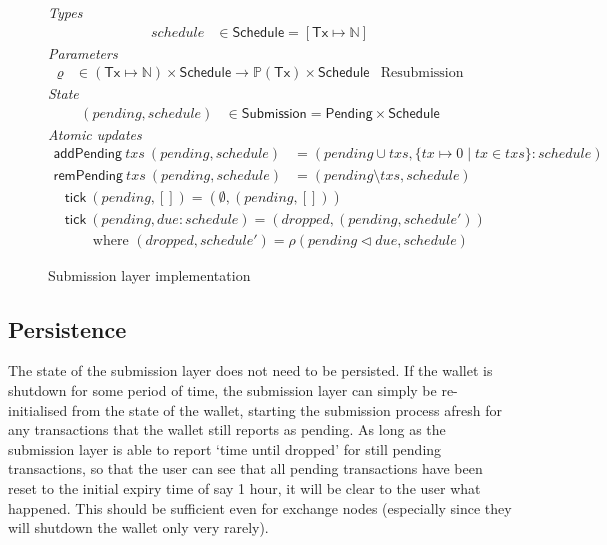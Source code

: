 \documentclass{article}
\newcommand{\restrictdom}{\lhd}
\theoremstyle{definition}{
  \newtheorem{lemma}{Lemma}[section] %
  \newtheorem{definition}[lemma]{Definition}
}
\theoremstyle{theorem}{
  \newtheorem{invariant}[lemma]{Invariant}
  \newtheorem{proofobligation}[lemma]{Proof Obligation}
}
\numberwithin{equation}{lemma}
\begin{document}
\begin{figure}
%
\emph{Types}
%
\begin{align*}
  \mathit{schedule}
& \in \mathsf{Schedule} = [\mathsf{Tx} \mapsto \mathbb{N}]
\end{align*}
%
\emph{Parameters}
%
\begin{align*}
  \varrho
& \in (\mathsf{Tx} \mapsto \mathbb{N}) \times \mathsf{Schedule} \rightarrow \mathbb{P}(\mathsf{Tx}) \times \mathsf{Schedule} & \text{Resubmission}
\end{align*}
%
\emph{State}
%
\begin{align*}
  (\mathit{pending}, \mathit{schedule})
& \in \mathsf{Submission} = \mathsf{Pending} \times \mathsf{Schedule}
\end{align*}
%
\emph{Atomic updates}
%
\begin{align*}
  \mathsf{addPending}
    ~ \mathit{txs}
    ~ (\mathit{pending}, \mathit{schedule})
& = ( \mathit{pending} \cup \mathit{txs}
    , \{ \mathit{tx} \mapsto 0 \mid \mathit{tx} \in \mathit{txs} \} : \mathit{schedule}
    )
\\
  \mathsf{remPending}
    ~ \mathit{txs}
    ~ (\mathit{pending}, \mathit{schedule})
& = ( \mathit{pending} \setminus \mathit{txs}
    , \mathit{schedule}
    )
\end{align*}
\begin{align*}
& \mathsf{tick} ~ (\mathit{pending}, []) = (\emptyset, (\mathit{pending}, [])) \\
& \mathsf{tick} ~ (\mathit{pending}, \mathit{due} : \mathit{schedule})
= (\mathit{dropped}, (\mathit{pending}, \mathit{schedule'})) \\
& \qquad\text{where~} (\mathit{dropped}, \mathit{schedule}')
= \rho(\mathit{pending} \restrictdom \mathit{due}, \mathit{schedule})
\end{align*}
%
\caption{\label{fig:submission_layer_impl}Submission layer implementation}
\end{figure}

\subsection{Persistence}

The state of the submission layer does not need to be persisted. If the wallet
is shutdown for some period of time, the submission layer can simply be
re-initialised from the state of the wallet, starting the submission process
afresh for any transactions that the wallet still reports as pending. As long
as the submission layer is able to report `time until dropped' for still
pending transactions, so that the user can see that all pending transactions
have been reset to the initial expiry time of say 1 hour, it will be clear to
the user what happened. This should be sufficient even for exchange nodes
(especially since they will shutdown the wallet only very rarely).
\end{document}
